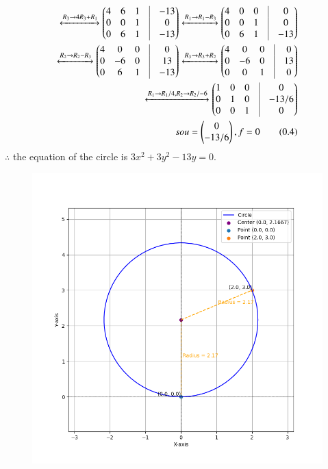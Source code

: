 \documentclass[journal]{IEEEtran}
\begin{document}
\begin{align*}
	\xleftrightarrow[]{R_3 \rightarrow 4R_3+R_1}
	 \myvec{4 & 6 & 1 & \vrule & -13\\
         0 &  0 & 1 & \vrule & 0\\
         0 &  6 & 1 & \vrule & -13} 
	 \xleftrightarrow[]{R_1\rightarrow R_1-R_3}
	 \myvec{4 & 0 & 0 & \vrule & 0\\
	 0 & 0 & 1 & \vrule & 0\\
	 0 & 6 & 1 &\vrule & -13}\\
	 \xleftrightarrow[]{R_2\rightarrow R_2-R_3}
	 \myvec{4 & 0 & 0 &\vrule & 0\\
	 0 & -6 & 0 & \vrule & 13 \\
	 0 & 6 & 1 & \vrule & -13}
	 \xleftrightarrow[]{R_3\rightarrow R_3+R_2}
	 \myvec{4 & 0 & 0 &\vrule & 0\\
	 0 & -6 & 0 & \vrule & 13 \\
	 0 & 0 & 1 & \vrule & 0}\\
	 \xleftrightarrow[]{R_1\rightarrow R_1/4, R_2 \rightarrow R_2/-6}
	 \myvec{1 & 0 & 0 &\vrule & 0\\
         0 & 1 & 0 & \vrule & -13/6 \\
         0 & 0 & 1 & \vrule & 0}\\
	 so u=\myvec{0 \\ -13/6},f=0 \tag{0.4}
\end{align*}
$\therefore$ the equation of the circle is $3x^2+3y^2-13y=0$.
\begin{table}[h!]    
  \centering
  
	\label{7-7.2-19}
\end{table}
\begin{figure}[h!]
	\centering
	\includegraphics[width=0.7\linewidth]{figs/Fig1.png}
\end{figure}
\end{document}
